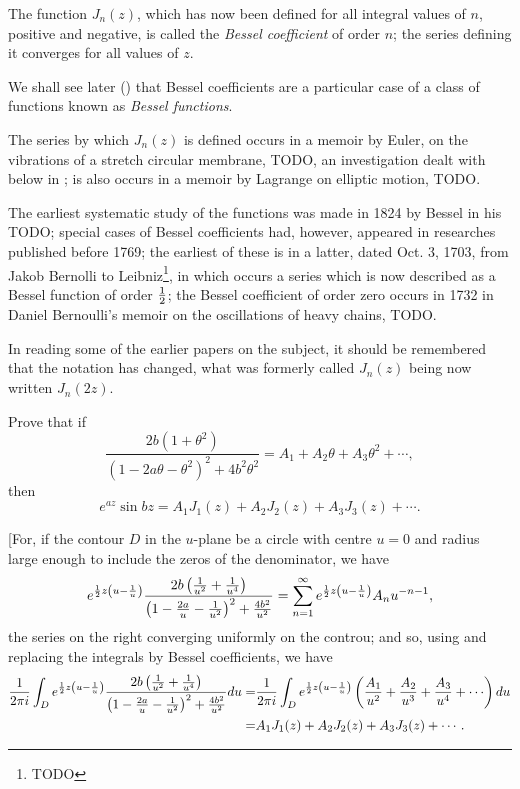 \documentclass{book}
\begin{document}
The function $J_n(z)$, which has now been defined for all integral
values of $n$, positive and negative, is called the
\emph{Bessel coefficient} of order $n$; the series defining it 
converges for all values of $z$.

We shall see later () that Bessel
coefficients are a particular case of a class of functions known as
\emph{Bessel functions}.

The series by which $J_n(z)$ is defined occurs in a memoir by Euler,
on the vibrations of a stretch circular membrane, TODO, 
an investigation dealt with below in ;
is also occurs in a memoir by Lagrange on elliptic motion, TODO.

The earliest systematic study of the functions was made in 1824 by
Bessel in his TODO; special cases of Bessel coefficients had, however,
appeared in researches published before 1769; the earliest of these is
in a latter, dated Oct. 3, 1703, from Jakob Bernolli to
Leibniz\footnote{TODO}, in which occurs a series which is now
described as a Bessel function of order $\frac{1}{2}$; the Bessel
coefficient of order zero occurs in 1732 in Daniel Bernoulli's memoir
on the oscillations of heavy chains, TODO.

In reading some of the earlier papers on the subject, it should be
remembered that the notation has changed, what was formerly called
$J_n(z)$ being now written $J_n(2z)$.
\begin{wandwexample}
Prove that if 
$$
\frac{ 2b(1+\theta^2)  }{ (1-2a\theta-\theta^2)^2 + 4b^2\theta^2  }
=
A_1 + A_2 \theta + A_3 \theta^2 + \cdots,
$$
then
$$
e^{az} \sin bz 
=
A_1 J_1(z) + A_2 J_2(z) + A_3 J_3(z) + \cdots.
$$
\end{wandwexample}

[For, if the contour $D$ in the $u$-plane be a circle with centre
$u=0$ and radius large enough to include the zeros of the denominator,
we have
$$
e^{\frac{1}{2} z \left( u - \frac{1}{u} \right)} 
\frac{ 2b \left( \frac{1}{u^2} + \frac{1}{u^4}  \right)  }{ \left( 1 -
    \frac{2a}{u} - \frac{1}{u^2} \right)^2
  + \frac{4 b^2}{u^2}  }
=
\sum_{n=1}^{\infty}
e^{\frac{1}{2} z \left( u - \frac{1}{u} \right)} A_n u^{-n-1},
$$
the series on the right converging uniformly on the controu; and so, 
using  and replacing the integrals by Bessel
coefficients, we have
\begin{align*}
  \frac{1}{2\pi i}
  \int_D
  e^{\half z \theparen{u - \frac{1}{u}}}
  \frac{ 2b \theparen{\frac{1}{u^2} + \frac{1}{u^4} }  }{ \theparen{1 -
      \frac{2a}{u} - \frac{1}{u^2}}^2
    + \frac{4 b^2}{u^2}  }
  \dmeasure u
  =& \frac{1}{2\pi i}
  \int_D
  e^{\half z \theparen{u - \frac{1}{u}}}
  \theparen{ \frac{A_1}{u^2} + \frac{A_2}{u^3} + \frac{A_3}{u^4} +
    \cdots  }
  \dmeasure u \\
  =& A_1 J_1(z) + A_2 J_2(z) + A_3 J_3(z) + \cdots .
\end{align*}
\end{document}
